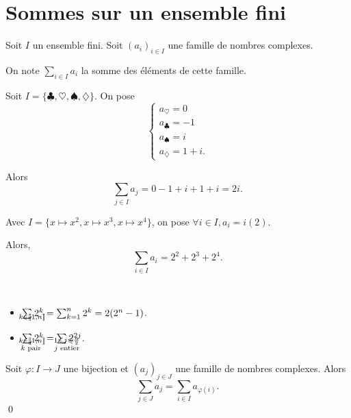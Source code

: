 \part{Sommes sur un ensemble fini}

\begin{defn}
	Soit $I$ un ensemble fini. Soit $(a_i)_{i\in I}$ une famille de nombres complexes.

	On note $\sum_{i \in I}a_i$ la somme des éléments de cette famille.
\end{defn}

\begin{exm}
	Soit $I = \{\clubsuit, \heartsuit, \spadesuit, \diamondsuit\}$. On pose \[
		\begin{cases}
			a_{\heartsuit} = 0\\
			a_{\clubsuit} = -1\\
			a_{\spadesuit} = i\\
			a_{\diamondsuit} = 1 + i.
		\end{cases}
	\]

	Alors \[
		\sum_{j \in I} a_j = 0 - 1 + i + 1 + i = 2i.
	\]
\end{exm}

\begin{exm}
	Avec $I = \{x\mapsto x^2, x\mapsto x^3, x\mapsto x^4\}$, on pose $\forall i \in I, a_i = i(2)$.

	Alors, \[
		\sum_{i \in I} a_i = 2^2 + 2^3 + 2^{4}.
	\]
\end{exm}

\begin{exm}~\newline
	\begin{itemize}
		\item $\sum_{\mathclap{k\in \left\llbracket 1,n \right\rrbracket}} 2^k = \sum_{k=1}^n 2^k = 2(2^{n} - 1)$.\\
		\item $\sum_{\mathclap{\substack{k \in \left\llbracket 1,n \right\rrbracket\\k \text{ pair }}}} 2^{k} = \sum_{\mathclap{\substack{1\le j\le \frac{n}{2}\\j \text{ entier}}}} 2^{2j}$.
	\end{itemize}
\end{exm}

\begin{prop}
	Soit $\varphi:I \to J$ une bijection et $(a_j)_{j\in J}$ une famille de nombres complexes. Alors \[
		\sum_{j \in J}a_j = \sum_{i \in I} a_{\varphi(i)}.
	\]\qed
\end{prop}

